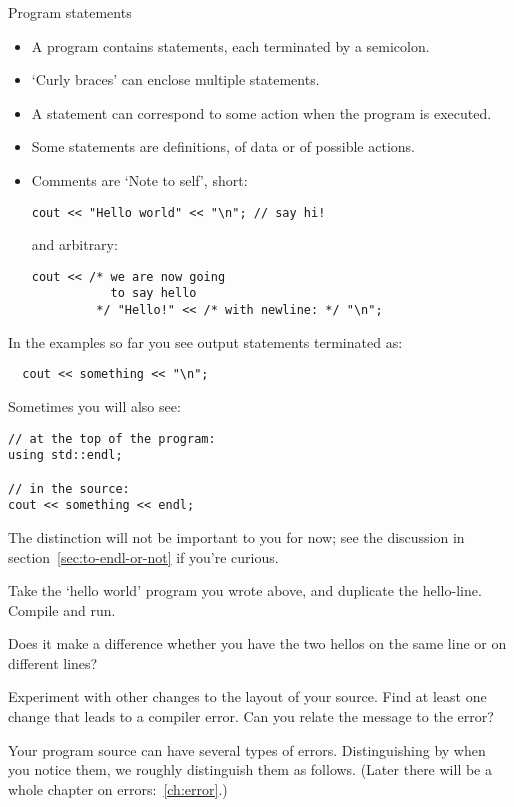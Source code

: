 \begin{block}{Program statements}
  \label{sl:cstatement}
  \begin{itemize}
  \item
    A program contains statements, each terminated by a semicolon.
  \item `Curly braces' can enclose multiple statements.
  \item A statement can correspond to some action when the program is
    executed.
  \item Some statements are definitions, of data or of possible actions.
  \item Comments are `Note to self', short:
\begin{lstlisting}
cout << "Hello world" << "\n"; // say hi!
\end{lstlisting}
and arbitrary:
\begin{lstlisting}
cout << /* we are now going
           to say hello
         */ "Hello!" << /* with newline: */ "\n";
\end{lstlisting}
  \end{itemize}
\end{block}

In the examples so far you see output statements terminated as:
\begin{lstlisting}
  cout << something << "\n";
\end{lstlisting}
Sometimes you will also see:
\begin{lstlisting}
// at the top of the program:
using std::endl;

// in the source:
cout << something << endl;
\end{lstlisting}
The distinction will not be important to you for now;
see the discussion in section~\ref{sec:to-endl-or-not}
if you're curious.

\begin{exercise}
  \label{ex:hello-line}
  Take the `hello world' program you wrote above, and duplicate the
  hello-line. Compile and run.

  Does it make a difference whether you have the two hellos on the
  same line or on different lines?

  Experiment with other changes to the layout of your source. Find at
  least one change that leads to a compiler error. Can you relate the
  message to the error?
\end{exercise}

Your program source can have several types of errors.
Distinguishing by when you notice them, we roughly distinguish them
as follows.
(Later there will be a whole chapter on errors:~\ref{ch:error}.)

